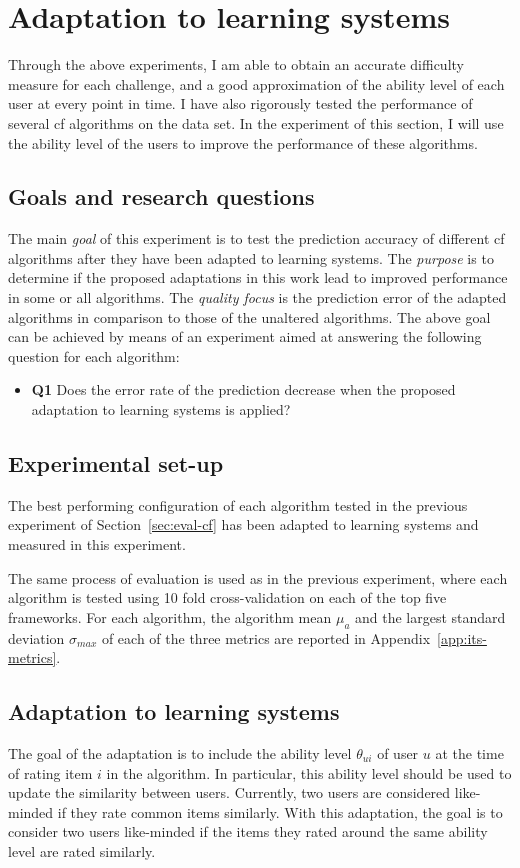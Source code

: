 \section{Adaptation to learning systems}
\label{sec:eval-learning}

Through the above experiments, I am able to obtain an accurate difficulty measure for each challenge, and a good approximation of the ability level of each user at every point in time.
I have also rigorously tested the performance of several \gls{cf} algorithms on the data set.
In the experiment of this section, I will use the ability level of the users to improve the performance of these algorithms.

\subsection{Goals and research questions}
The main \textit{goal} of this experiment is to test the prediction accuracy of different \gls{cf} algorithms after they have been adapted to learning systems.
The \textit{purpose} is to determine if the proposed adaptations in this work lead to improved performance in some or all algorithms.
The \textit{quality focus} is the prediction error of the adapted algorithms in comparison to those of the unaltered algorithms.
The above goal can be achieved by means of an experiment aimed at answering the following question for each algorithm:
\begin{itemize}
    \item \textbf{Q1} Does the error rate of the prediction decrease when the proposed adaptation to learning systems is applied?
\end{itemize}

\subsection{Experimental set-up}
The best performing configuration of each algorithm tested in the previous experiment of Section~\ref{sec:eval-cf} has been adapted to learning systems and measured in this experiment.

The same process of evaluation is used as in the previous experiment, where each algorithm is tested using 10 fold cross-validation on each of the top five frameworks.
For each algorithm, the algorithm mean $\mu_a$ and the largest standard deviation $\sigma_{max}$ of each of the three metrics are reported in Appendix~\ref{app:its-metrics}.

\subsection{Adaptation to learning systems}
The goal of the adaptation is to include the ability level $\theta_{ui}$ of user $u$ at the time of rating item $i$ in the algorithm.
In particular, this ability level should be used to update the similarity between users.
Currently, two users are considered like-minded if they rate common items similarly.
With this adaptation, the goal is to consider two users like-minded if the items they rated around the same ability level are rated similarly.

